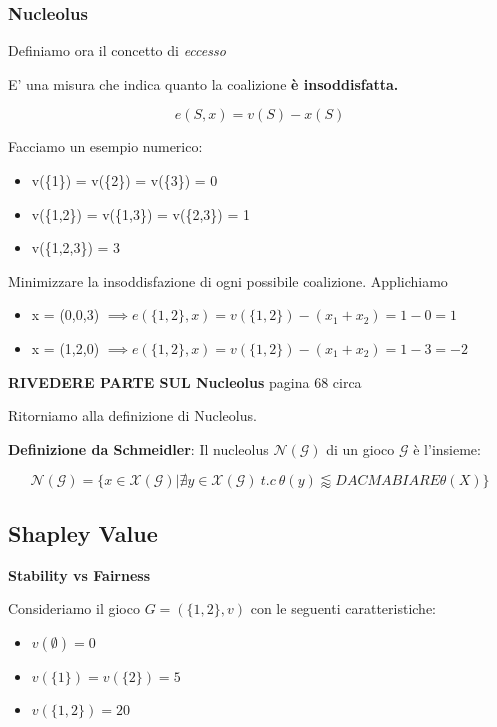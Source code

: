 \subsubsection{Nucleolus}

Definiamo ora il concetto di \textit{eccesso}

\begin{definition}[Eccesso]
    E' una misura che indica quanto la coalizione \textbf{è insoddisfatta.}

    \begin{equation}
        e(S,x) = v(S) - x(S)
    \end{equation}
\end{definition}

Facciamo un esempio numerico:

\begin{itemize}
    \item v(\{1\}) = v(\{2\}) = v(\{3\}) = 0
    \item v(\{1,2\}) = v(\{1,3\}) = v(\{2,3\}) = 1
    \item v(\{1,2,3\}) = 3
\end{itemize}

Minimizzare la insoddisfazione di ogni possibile coalizione. Applichiamo

\begin{itemize}
    \item x = (0,0,3) $\implies e(\{1,2\}, x) = v(\{1,2\}) - (x_1+x_2) = 1-0=1$
    \item x = (1,2,0) $\implies e(\{1,2\}, x) = v(\{1,2\}) - (x_1+x_2) = 1-3=-2$
\end{itemize}

\textbf{RIVEDERE PARTE SUL Nucleolus} pagina 68 circa

Ritorniamo alla definizione di Nucleolus.

\textbf{Definizione da Schmeidler}: Il nucleolus $\mathcal{N}(\mathcal{G})$ di un gioco $\mathcal{G}$ è l'insieme:

\[
    \mathcal{N}(\mathcal{G}) = \{x \in \mathcal{X}(\mathcal{G})|\nexists y \in \mathcal{X}(\mathcal{G}) \ t.c\ \theta(y) \lessapprox DA CMABIARE \theta(X) \}
\]

\subsection{Shapley Value}

\textbf{Stability vs Fairness}

Consideriamo il gioco $G = (\{1, 2\}, v)$ con le seguenti caratteristiche:
\begin{itemize}
    \item $v(\emptyset) = 0$
    \item $v(\{1\}) = v(\{2\}) = 5$
    \item $v(\{1, 2\}) = 20$
\end{itemize}

